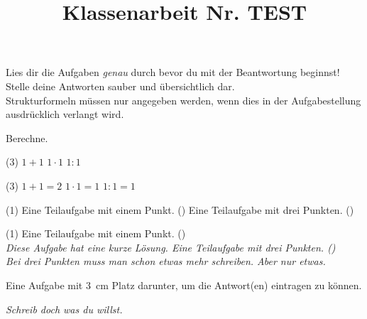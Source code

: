 \documentclass[chem]{kska}
\title{Klassenarbeit Nr. TEST}
\begin{document}
  \nameline
  
  \begin{framed}\noindent Lies dir die Aufgaben \emph{genau} durch bevor du mit der Beantwortung
beginnst! Stelle deine Antworten sauber und übersichtlich dar.\\
Strukturformeln müssen nur angegeben werden, wenn dies in der
Aufgabestellung ausdrücklich verlangt wird.
\end{framed}


  \begin{question}[subtitle=Wiederholungsaufgabe]{2}
    Berechne.
    \begin{tasks}(3)
      \task $1 + 1$
      \task $1 \cdot 1$
      \task $1 : 1$
    \end{tasks}
  \end{question}
  \begin{solution}
    \begin{tasks}(3)
      \task $1 + 1 = 2$
      \task $1 \cdot 1 = 1$
      \task $1 : 1 = 1$
    \end{tasks}
  \end{solution}
  
  
  \begin{question}{4}
    \begin{tasks}(1)
      \task  Eine Teilaufgabe mit einem Punkt. ()
      \task  Eine Teilaufgabe mit drei Punkten. ()
    \end{tasks}
  \end{question}
  \begin{solution}
      \begin{tasks}(1)
      \task  Eine Teilaufgabe mit einem Punkt. ()\\
        \itshape{Diese Aufgabe hat eine kurze Lösung.}
      \task  Eine Teilaufgabe mit drei Punkten. ()\\
        \itshape{Bei drei Punkten muss man schon etwas mehr schreiben. Aber nur etwas.}
    \end{tasks}
  \end{solution}
  
  
  \begin{question}[skip-below=3cm]{2}
  Eine Aufgabe mit \SI{3}{\centi\meter} Platz darunter, um die Antwort(en) eintragen zu können.
  \end{question}
  \begin{solution}
    \itshape{Schreib doch was du willst.}
  \end{solution}
  
\end{document}
